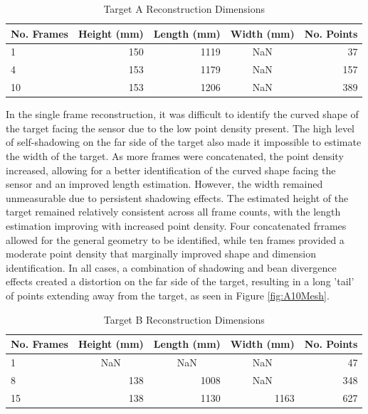\begin{table}[H]
\centering
\begin{tabular}{|l|r|r|c|r|}
\hline
\multicolumn{1}{|c|}{\textbf{No. Frames}} &
  \multicolumn{1}{c|}{\textbf{Height (mm)}} &
  \multicolumn{1}{c|}{\textbf{Length (mm)}} &
  \multicolumn{1}{c|}{\textbf{Width (mm)}} &
  \multicolumn{1}{c|}{\textbf{No. Points}} \\ \hline
1  & 150 & 1119 & NaN & 37  \\ \hline
4  & 153 & 1179 & NaN & 157 \\ \hline
10 & 153 & 1206 & NaN & 389 \\ \hline
\end{tabular}
\caption{Target A Reconstruction Dimensions}
\label{tab:target_a}
\end{table}

In the single frame reconstruction, it was difficult to identify the curved shape of the target facing the sensor due to the low point density present. The high level of self-shadowing on the far side of the target also made it impossible to estimate the width of the target. As more frames were concatenated, the point density increased, allowing for a better identification of the curved shape facing the sensor and an improved length estimation. However, the width remained unmeasurable due to persistent shadowing effects. The estimated height of the target remained relatively consistent across all frame counts, with the length estimation improving with increased point density. Four concatenated frrames allowed for the general geometry to be identified, while ten frames provided a moderate point density that marginally improved shape and dimension identification. In all cases, a combination of shadowing and bean divergence effects created a distortion on the far side of the target, resulting in a long 'tail' of points extending away from the target, as seen in Figure \ref{fig:A10Mesh}.

\begin{table}[H]
\centering
\begin{tabular}{|l|c|c|c|r|}
\hline
\multicolumn{1}{|c|}{\textbf{No. Frames}} & \textbf{Height (mm)} & \textbf{Length (mm)} & \textbf{Width (mm)} & \multicolumn{1}{l|}{\textbf{No. Points}} \\ \hline
1  & NaN                      & NaN                       & NaN                       & 47  \\ \hline
8  & \multicolumn{1}{r|}{138} & \multicolumn{1}{r|}{1008} & NaN                       & 348 \\ \hline
15 & \multicolumn{1}{r|}{138} & \multicolumn{1}{r|}{1130} & \multicolumn{1}{r|}{1163} & 627 \\ \hline
\end{tabular}
\caption{Target B Reconstruction Dimensions}
\label{tab:target_b}
\end{table}

